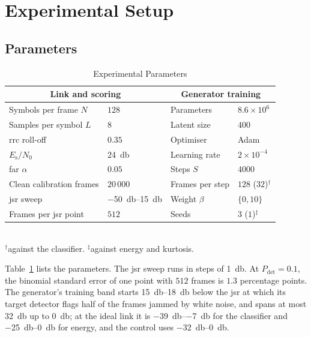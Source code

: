 \section{Experimental Setup} \label{sec:expsetup}

\subsection{Parameters} \label{sec:expsetup:params}

\begin{table}[t]
\centering
\caption{Experimental Parameters}
\label{tab:exp_params}
    \begin{tabular}{@{}p{89pt}p{40pt}p{60pt}p{25pt}@{}}
    \toprule
    \multicolumn{2}{c}{\textbf{Link and scoring}} & \multicolumn{2}{c}{\textbf{Generator training}} \\
    \midrule
    Symbols per frame $N$ & $128$ & Parameters & $8.6\times10^{6}$ \\
    Samples per symbol $L$ & $8$ & Latent size & $400$ \\
    \ac{rrc} roll-off & $0.35$ & Optimiser & Adam \\
    $E_\text{s}/N_0$ & \SI{24}{\decibel} & Learning rate & $2\times10^{-4}$ \\
    \ac{far} $\alpha$ & $0.05$ & Steps $S$ & $4000$ \\
    Clean calibration frames & $20\,000$ & Frames per step & $128$ ($32$)$^{\dagger}$ \\
    \ac{jsr} sweep & \SIrange{-50}{15}{\decibel} & Weight $\beta$ & $\{0,10\}$ \\
    Frames per \ac{jsr} point & $512$ & Seeds & $3$ ($1$)$^{\ddagger}$ \\
    \bottomrule
    \end{tabular}
    \\[2pt]{\footnotesize $^{\dagger}$against the classifier. $^{\ddagger}$against energy and kurtosis.}
\end{table}

Table~\ref{tab:exp_params} lists the parameters.
The \ac{jsr} sweep runs in steps of \SI{1}{\decibel}.
At $P_\text{det}=0.1$, the binomial standard error of one point with $512$ frames is $1.3$ percentage points.
The generator's training band starts \SIrange{15}{18}{\decibel} below the \ac{jsr} at which its target detector flags half of the frames jammed by white noise, and spans at most \SI{32}{\decibel} up to \SI{0}{\decibel}; at the ideal link it is \SIrange{-39}{-7}{\decibel} for the classifier and \SIrange{-25}{0}{\decibel} for energy, and the control uses \SIrange{-32}{0}{\decibel}.

